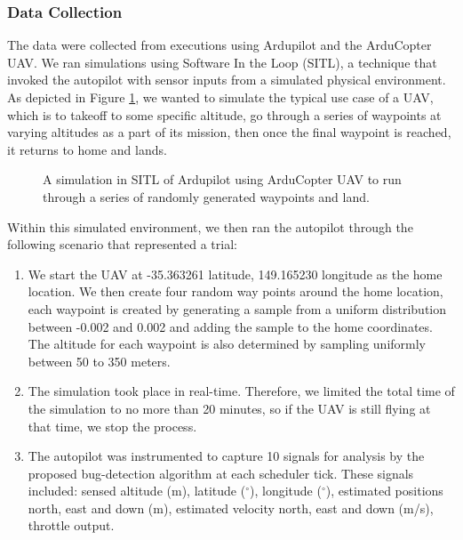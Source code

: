 \subsubsection{Data Collection}

The data were collected from executions using Ardupilot and the
ArduCopter UAV. We ran simulations using Software In the Loop
(SITL), a technique that invoked the autopilot with sensor inputs from
a simulated physical environment. As depicted in Figure \ref{fig:ardusim}, we
wanted to simulate the typical use case of a UAV, which is to takeoff
to some specific altitude, go through a series of waypoints at varying
altitudes as a part of its mission, then once the final waypoint is
reached, it returns to home and lands.

\begin{figure}[h]
  \caption{A simulation in SITL of Ardupilot using ArduCopter UAV to
    run through a series of randomly generated waypoints and land.}
  \label{fig:ardusim}
\end{figure}

Within this simulated environment, we then ran the
autopilot through the following scenario that represented a trial:

\begin{enumerate}
\item We start the UAV at -35.363261 latitude,
  149.165230 longitude as the home location. We then create four
  random way points around the home location, each waypoint is
  created by generating a sample from a uniform distribution
  between -0.002 and 0.002 and adding the sample to the home
  coordinates. The altitude for each waypoint is also determined
  by sampling uniformly between 50 to 350 meters.
\item The simulation took place in real-time. Therefore, we
  limited the total time of the simulation to no more than 20
  minutes, so if the UAV is still flying at that time, we stop
  the process.
  \item The autopilot was instrumented to capture 10 signals for
    analysis by the proposed bug-detection algorithm at each scheduler
    tick. These signals included: sensed altitude (m), latitude
    ($^\circ$), longitude ($^\circ$), estimated positions north, east
    and down (m), estimated velocity north, east and down (m/s),
    throttle output.

    
\end{enumerate}

